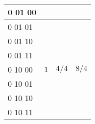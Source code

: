 \begin{problem}{8}
\begin{center}
\begin{tabular}{|l||c|c|c|}
0 01 00 &  &  &  \\
\hline

0 01 01 &  &  &  \\
\hline

0 01 10 &  &  &  \\
\hline

0 01 11 &  &  &  \\
\hline

0 10 00 & $1$ & $4/4$ & $8/4$ \\
\hline

0 10 01 &  &  &  \\
\hline

0 10 10 & &  &  \\
\hline

0 10 11 &  &  &  \\
\hline

\end{tabular}
\end{center}

\end{problem}
